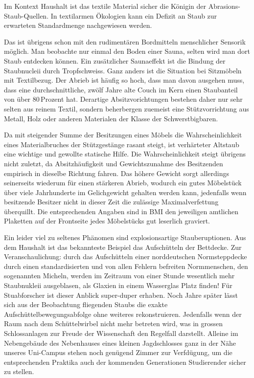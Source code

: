 Im Kontext Haushalt ist das textile Material sicher die Königin der Abrasions-Staub-Quellen. In textilarmen Ökologien kann ein Defizit an Staub zur erwarteten Standardmenge nachgewiesen werden.

Das ist übrigens schon mit den rudimentären Bordmitteln menschlicher Sensorik möglich. Man beobachte nur einmal den Boden einer Sauna, selten wird man dort Staub entdecken können. Ein zusätzlicher Saunaeffekt ist die Bindung der Staubnucleii durch Tropfschweiss. Ganz anders ist die Situation bei Sitzmöbeln mit Textilbezug. Der Abrieb ist häufig so hoch, dass man davon ausgehen muss, dass eine durchschnittliche, zwölf Jahre alte Couch im Kern einen Staubanteil von über 80\,Prozent hat. Derartige Absitzvorichtungen bestehen daher nur sehr selten aus reinem Textil, sondern beherbergen zuemeist eine Stützvorrichtung aus Metall, Holz oder anderen Materialen der Klasse der Schwerstbigbaren. 

Da mit steigender Summe der Besitzungen eines Möbels die Wahrscheinlichkeit eines Materialbruches der Stützgestänge rasant steigt, ist verhärteter Altstaub eine wichtige und gewollte statische Hilfe. Die Wahrscheinlichkeit steigt übrigens nicht zuletzt, da Absitzhäufigkeit und Gewichtszunahme des Besitzenden empirisch in dieselbe Richtung fahren. Das höhere Gewicht sorgt allerdings seinerseits wiederum für einen stärkeren Abrieb, wodurch ein gutes Möbelstück über viele Jahrhunderte im Gelichgewicht gehalten werden kann, jedenfalls wenn besitzende Besitzer nicht in dieser Zeit die zulässige Maximalverfettung überquillt. Die entsprechenden Angaben sind in BMI den jeweiligen amtlichen Plaketten auf der Frontseite jedes Möbelstücks gut leserlich graviert.

Ein leider viel zu seltenes Phänomen sind explosionsartige Stauberuptionen. Aus dem Haushalt ist das bekannteste Beispiel das Aufschütteln der Bettdecke. Zur Veranschaulichung: durch das Aufschütteln einer norddeutschen Normsteppdecke durch einen standardisierten und von allen Fehlern befreiten Normmenschen, den sogenannten Micheln, werden im Zeitraum von einer Stunde wesentlich mehr Staubnukleii ausgeblasen, als Glaxien in einem Wasserglas Platz finden! Für Stuabforscher ist dieser Anblick super-duper erhaben. Noch Jahre später lässt sich aus der Beobachtung fliegenden Staubs die exakte Aufschüttelbewegungsabfolge ohne weiteres rekonstruieren. Jedenfalls wenn der Raum nach dem Schüttelwirbel nicht mehr betreten wird, was in grossen Schlossanlagen zur Freude der Wissenschaft den Regelfall darstellt. Alleine im Nebengebäude des Nebenhauses eines kleinen Jagdschlosses ganz in der Nähe unseres Uni-Campus stehen noch genügend Zimmer zur Verfdügung, um die entsprechenden Praktika auch der kommenden Generationen Studierender sicher zu stellen.

